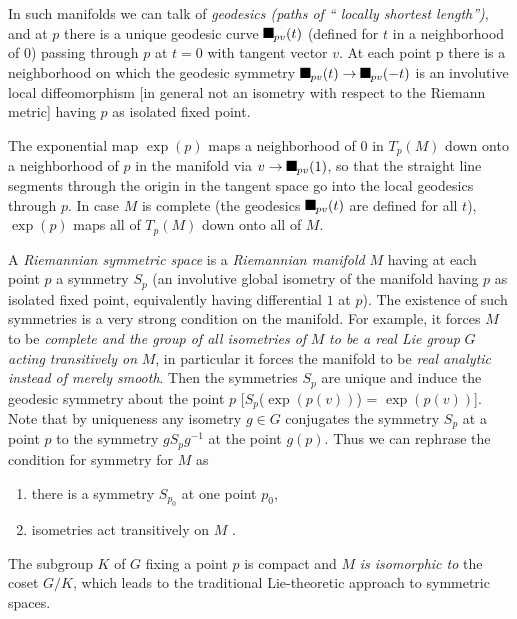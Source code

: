 \documentclass[aps,preprint]{revtex4}%
\providecommand{\U}[1]{\protect\rule{.1in}{.1in}}
\begin{document}
In such manifolds we can talk of \emph{geodesics (paths of \textquotedblleft
locally shortest length\textquotedblright)}, and at $p$ there is a unique
geodesic curve $\U{3b3} _{pv}(t)$ (defined for $t$ in a neighborhood of $0$)
passing through $p$ at $t=0$ with tangent vector $v$. At each point p there is
a neighborhood on which the geodesic symmetry $\U{3b3} _{pv}(t)\rightarrow
\U{3b3} _{pv}(-t)$ is an involutive local diffeomorphism [in general not an
isometry with respect to the Riemann metric] having $p$ as isolated fixed point.

The exponential map $\exp\left(  p\right)  $ maps a neighborhood of $0$ in
$T_{p}(M)$ down onto a neighborhood of $p$ in the manifold via $v\rightarrow
\U{3b3} _{pv}(1)$, so that the straight line segments through the origin in
the tangent space go into the local geodesics through $p$. In case $M$ is
complete (the geodesics $\U{3b3} _{pv}(t)$ are defined for all $t$),
$\exp\left(  p\right)  $ maps all of $T_{p}(M)$ down onto all of $M$.

A \emph{Riemannian symmetric space} is a \emph{Riemannian manifold }$M$ having
at each point $p$ a symmetry $S_{p}$ (an involutive global isometry of the
manifold having $p$ as isolated fixed point, equivalently having differential
$1$ at $p$). The existence of such symmetries is a very strong condition on
the manifold. For example, it forces $M$ to be \emph{complete and the group of
all isometries of }$M$\emph{ to be a real Lie group }$G$\emph{ acting
transitively on} $M$, in particular it forces the manifold to be \emph{real
analytic instead of merely smooth}. Then the symmetries $S_{p}$ are unique and
induce the geodesic symmetry about the point $p$ [$S_{p}$($\exp\left(
p(v)\right)  $) = $\exp\left(  p(v)\right)  $]. Note that by uniqueness any
isometry $g\in G$ conjugates the symmetry $S_{p}$ at a point $p$ to the
symmetry $gS_{p}g^{-1}$ at the point $g(p)$. Thus we can rephrase the
condition for symmetry for $M$ as

\begin{enumerate}
\item there is a symmetry $S_{p_{0}}$ at one point $p_{0}$,

\item isometries act transitively on $M$ .
\end{enumerate}

The subgroup $K$ of $G$ fixing a point $p$ is compact and $M$ \emph{is
isomorphic to} the coset $G/K$, which leads to the traditional Lie-theoretic
approach to symmetric spaces.
\end{document}
